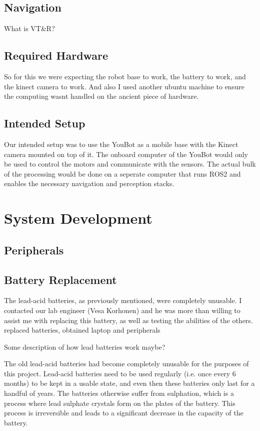 \documentclass[a4paper, 12pt]{article}
\begin{document}
    \subsection{Navigation}
    What is VT\&R?
    \subsection{Required Hardware}
    So for this we were expecting the robot base to work, the battery to work, and the kinect camera to work. And also I used another ubuntu machine to ensure the computing wasnt handled on the ancient piece of hardware. 
    \subsection{Intended Setup}
    Our intended setup was to use the YouBot as a mobile base with the Kinect camera mounted on top of it. The onboard computer of the YouBot would only be used to control the motors and communicate with the sensors. The actual bulk of the processing would be done on a seperate computer that runs ROS2 and enables the necessary navigation and perception stacks.  

    \pagebreak

    \section{System Development}
    \subsection{Peripherals}

    \subsection{Battery Replacement}
    The lead-acid batteries, as previously mentioned, were completely unusable. I contacted our lab engineer (Vesa Korhonen) and he was more than willing to assist me with replacing this battery, as well as testing the abilities of the others. 
    replaced batteries, obtained laptop and peripherals

    Some description of how lead batteries work maybe? 

    The old lead-acid batteries had become completely unusable for the purposes of this project. Lead-acid batteries need to be used regularly (i.e. once every 6 months) to be kept in a usable state, and even then these batteries only last for a handful of years. The batteries otherwise suffer from sulphation, which is a process where lead sulphate crystals form on the plates of the battery. This process is irreversible and leads to a significant decrease in the capacity of the battery. 
\end{document}
